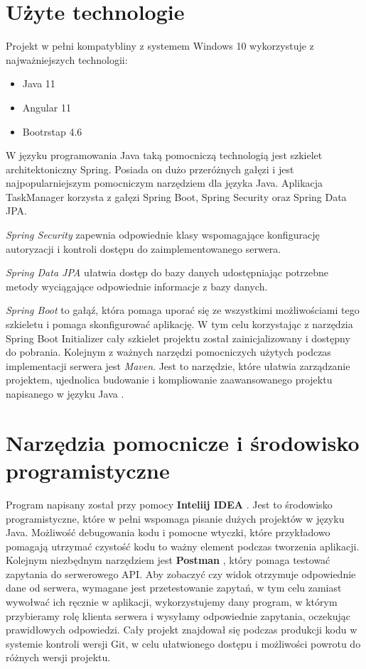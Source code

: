 \section{Użyte technologie}
Projekt w pełni kompatybliny z systemem Windows 10 wykorzystuje z najważniejszych technologii:
\begin{itemize}
	\item Java 11
	\item Angular 11
	\item Bootrstap 4.6
	
\end{itemize}
W języku programowania Java taką pomocniczą technologią jest szkielet architektoniczny Spring. Posiada on dużo przeróżnych gałęzi i jest najpopularniejszym pomocniczym narzędziem dla języka Java. Aplikacja TaskManager korzysta z gałęzi Spring Boot, Spring Security oraz Spring Data JPA. 

\textit{Spring Security} zapewnia odpowiednie klasy wspomagające konfigurację autoryzacji i kontroli dostępu do zaimplementowanego serwera. \cite{SpringSecurity}   
 
\textit{Spring Data JPA} ułatwia dostęp do bazy danych udostępniając potrzebne metody wyciągające odpowiednie informacje z bazy danych.\cite{SpringData}  
 
\textit{Spring Boot} to gałąź, która pomaga uporać się ze wszystkimi możliwościami tego szkieletu i pomaga skonfigurować aplikację. 
W tym celu korzystając z narzędzia Spring Boot Initializer \cite{SpringInitializr} cały szkielet projektu został zainicjalizowany i dostępny do pobrania.
Kolejnym z ważnych  narzędzi pomocniczych użytych podczas implementacji serwera jest \textit{ Maven}. Jest to narzędzie, które ułatwia zarządzanie projektem, ujednolica budowanie i kompliowanie zaawansowanego projektu napisanego w języku Java \cite{ApacheMavenProject}. 

\section{Narzędzia pomocnicze i środowisko programistyczne }
Program napisany został przy pomocy \textbf{Inteliij IDEA} . Jest to środowisko programistyczne, które w pełni wspomaga pisanie dużych projektów w języku Java. Możliwość debugowania kodu i pomocne wtyczki, które przykładowo pomagają utrzymać czystość kodu to ważny element podczas tworzenia aplikacji.
Kolejnym niezbędnym narzędziem jest \textbf{Postman }, który pomaga testować zapytania do serwerowego API. Aby zobaczyć czy widok otrzymuje odpowiednie dane od serwera, wymagane jest przetestowanie zapytań, w tym celu zamiast wywołwać ich ręcznie w aplikacji, wykorzystujemy dany program, w którym przybieramy rolę klienta serwera i wysyłamy odpowiednie zapytania, oczekując prawidłowych odpowiedzi. \cite{Postman}
Cały projekt znajdował się podczas produkcji kodu w systemie kontroli wersji Git, w celu ułatwionego dostępu i możliwości powrotu do różnych wersji projektu.\cite{git}

